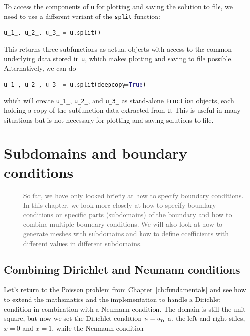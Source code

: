 \documentclass[graybox,envcountchap,sectrefs,final]{svmonodo}
\begin{document}
To access the components of \texttt{u} for plotting and saving the solution
to file, we need to use a different variant of the \texttt{split} function:

\begin{lstlisting}[language=Python,style=graycolor]
u_1_, u_2_, u_3_ = u.split()
\end{lstlisting}
This returns three subfunctions as actual objects with access to the
common underlying data stored in \texttt{u}, which makes plotting and saving
to file possible. Alternatively, we can do


\begin{lstlisting}[language=Python,style=graycolor]
u_1_, u_2_, u_3_ = u.split(deepcopy=True)
\end{lstlisting}
which will create \Verb!u_1_!, \Verb!u_2_!, and \Verb!u_3_! as stand-alone \texttt{Function}
objects, each holding a copy of the subfunction data extracted from
\texttt{u}. This is useful in many situations but is not necessary for
plotting and saving solutions to file.

\chapter{Subdomains and boundary conditions}
\label{ch:subdomains}



\begin{quote}
So far, we have only looked briefly at how to specify boundary
conditions. In this chapter, we look more closely at how to specify
boundary conditions on specific parts (subdomains) of the boundary and
how to combine multiple boundary conditions. We will also look at how to
generate meshes with subdomains and how to define coefficients
with different values in different subdomains.
\end{quote}



\section{Combining Dirichlet and Neumann conditions}
\label{ch:poisson0:DN}

Let's return to the Poisson problem from Chapter~\ref{ch:fundamentals}
and see how to extend the mathematics and the implementation to handle
a Dirichlet condition in combination with a Neumann condition. The
domain is still the unit square, but now we set the Dirichlet
condition $u=\ub$ at the left and right sides, $x=0$ and $x=1$, while
the Neumann condition
\end{document}

